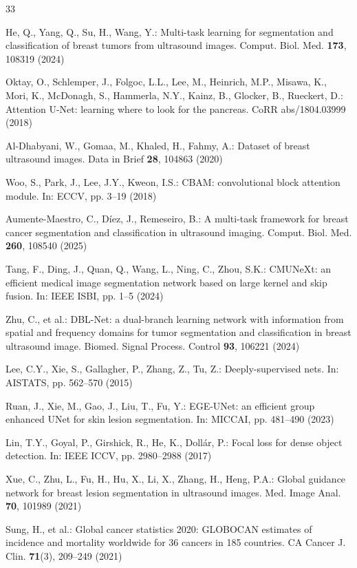 \documentclass[runningheads]{llncs}
\begin{document}
\begin{thebibliography}{33}

He, Q., Yang, Q., Su, H., Wang, Y.: Multi-task learning for segmentation and classification of breast tumors from ultrasound images. Comput. Biol. Med. \textbf{173}, 108319 (2024)

Oktay, O., Schlemper, J., Folgoc, L.L., Lee, M., Heinrich, M.P., Misawa, K., Mori, K., McDonagh, S., Hammerla, N.Y., Kainz, B., Glocker, B., Rueckert, D.: Attention U-Net: learning where to look for the pancreas. CoRR abs/1804.03999 (2018)

Al-Dhabyani, W., Gomaa, M., Khaled, H., Fahmy, A.: Dataset of breast ultrasound images. Data in Brief \textbf{28}, 104863 (2020)

Woo, S., Park, J., Lee, J.Y., Kweon, I.S.: CBAM: convolutional block attention module. In: ECCV, pp. 3--19 (2018)

Aumente-Maestro, C., Díez, J., Remeseiro, B.: A multi-task framework for breast cancer segmentation and classification in ultrasound imaging. Comput. Biol. Med. \textbf{260}, 108540 (2025)

Tang, F., Ding, J., Quan, Q., Wang, L., Ning, C., Zhou, S.K.: CMUNeXt: an efficient medical image segmentation network based on large kernel and skip fusion. In: IEEE ISBI, pp. 1--5 (2024)

Zhu, C., et al.: DBL-Net: a dual-branch learning network with information from spatial and frequency domains for tumor segmentation and classification in breast ultrasound image. Biomed. Signal Process. Control \textbf{93}, 106221 (2024)

Lee, C.Y., Xie, S., Gallagher, P., Zhang, Z., Tu, Z.: Deeply-supervised nets. In: AISTATS, pp. 562--570 (2015)

Ruan, J., Xie, M., Gao, J., Liu, T., Fu, Y.: EGE-UNet: an efficient group enhanced UNet for skin lesion segmentation. In: MICCAI, pp. 481--490 (2023)

Lin, T.Y., Goyal, P., Girshick, R., He, K., Dollár, P.: Focal loss for dense object detection. In: IEEE ICCV, pp. 2980--2988 (2017)

Xue, C., Zhu, L., Fu, H., Hu, X., Li, X., Zhang, H., Heng, P.A.: Global guidance network for breast lesion segmentation in ultrasound images. Med. Image Anal. \textbf{70}, 101989 (2021)

Sung, H., et al.: Global cancer statistics 2020: GLOBOCAN estimates of incidence and mortality worldwide for 36 cancers in 185 countries. CA Cancer J. Clin. \textbf{71}(3), 209--249 (2021)


\end{thebibliography}
\end{document}
